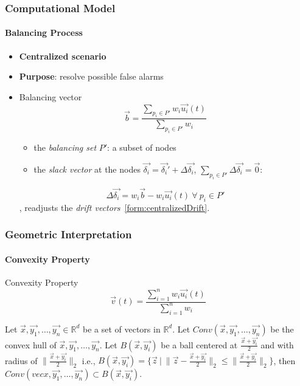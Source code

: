 \documentclass[hyperref={pdfpagelabels=false}]{beamer}
\begin{document}
\begin{frame} \frametitle{Computational Model}\framesubtitle{Balancing Process}
\begin{itemize}
\item[] \textbf{Centralized scenario}
\item[] \textbf{Purpose}: resolve possible false alarms
\item[]
\begin{block}{Balancing vector}
\begin{equation}
\vec{b}=\frac{ \sum_{p_i \in P'} {w_i\vec{u_i}(t)} }{ \sum_{p_i \in P'} {w_i} }
\label{form:balancingVector}
\end{equation}
\end{block}
\begin{itemize}
	\item the \emph{balancing set} $P'$: a subset of nodes
	\item the \emph{slack vector} at the nodes $\vec{\delta_i}=\vec{\delta_i}'+\Delta\vec{\delta_i}$, $\sum_{p_i \in P'} \Delta \vec{\delta_i}= \vec{0}$:
\end{itemize}
\begin{equation}
\Delta\vec{\delta_i}=w_i\vec{b}-w_i\vec{u_i}(t)\ \forall\ p_i \in P'
\end{equation}
, readjusts the \emph{drift vectors}~\eqref{form:centralizedDrift}.
\end{itemize}
\end{frame}

\begin{frame} \frametitle{Geometric Interpretation}\framesubtitle{Convexity Property}
\begin{block}{Convexity Property}
\begin{equation}
\vec{v}(t)=\frac{\sum_{i=1}^n {w_i\vec{u_i}(t)}}{\sum_{i=1}^n {w_i}}
\label{form:convexityProperty}
\end{equation}
\end{block}
\begin{theorem}\label{theorem:convexHull}
Let $\vec{x}, \vec{y_1}, \dots, \vec{y_n} \in \mathbb{R}^d$ be a set of vectors in $\mathbb{R}^d$. Let $Conv(\vec{x}, \vec{y_1}, \dots, \vec{y_n})$ be the convex hull of $\vec{x}, \vec{y_1}, \dots, \vec{y_n}$. Let $B(\vec{x}, \vec{y_i})$ be a ball centered at $\frac{\vec{x}+\vec{y_i}}{2}$ and with radius of $\lVert{\frac{\vec{x}+\vec{y_i}}{2}}\rVert_2$ i.e., $B(\vec{x}, \vec{y_i})=\{\vec{z}\ |\ \lVert{\vec{z}-\frac{\vec{x}+\vec{y_i}}{2}}\rVert_2 \leq \lVert{\frac{\vec{x}+\vec{y_i}}{2}}\rVert_2 \}$, then $Conv(vec{x}, \vec{y_1}, \dots, \vec{y_n}) \subset B(\vec{x}, \vec{y_i})$.
\end{theorem}
\end{frame}
\end{document}
